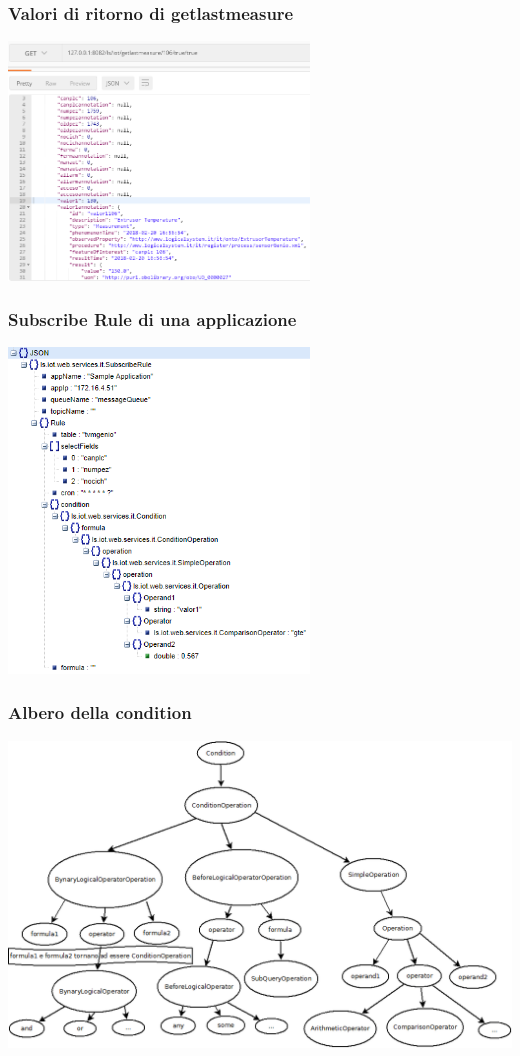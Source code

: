 \documentclass{beamer}
\begin{document}
\begin{frame}
\frametitle{Valori di ritorno di getlastmeasure}
\includegraphics[width=0.6\textwidth]{images/Postman1-corretto.png}
\end{frame}

\begin{frame}
\frametitle{Subscribe Rule di una applicazione}
\includegraphics[width=0.6\textwidth]{images/subscribe-json-1.png}
\end{frame}

\begin{frame}
\frametitle{Albero della condition}
\includegraphics[width=1\textwidth]{images/strutturaquerytree.png}
\end{frame}
\end{document}
